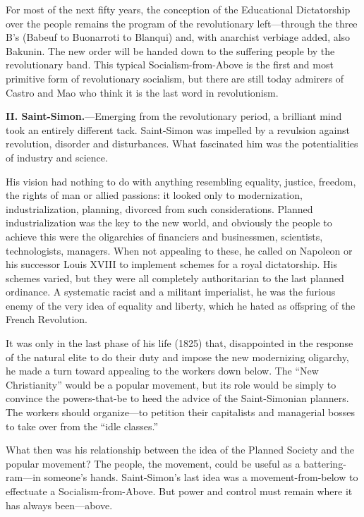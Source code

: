 For most of the next fifty years, the conception of the Educational Dictatorship over the people remains the program of the revolutionary left---through the three B's (Babeuf to Buonarroti to Blanqui) and, with anarchist verbiage added, also Bakunin. The new order will be handed down to the suffering people by the revolutionary band. This typical Socialism-from-Above is the first and most primitive form of revolutionary socialism, but there are still today admirers of Castro and Mao who think it is the last word in revolutionism.

\textbf{II. Saint-Simon.}---Emerging from the revolutionary period, a brilliant mind took an entirely different tack. Saint-Simon was impelled by a revulsion against revolution, disorder and disturbances. What fascinated him was the potentialities of industry and science.

His vision had nothing to do with anything resembling equality, justice, freedom, the rights of man or allied passions: it looked only to modernization, industrialization, planning, divorced from such considerations. Planned industrialization was the key to the new world, and obviously the people to achieve this were the oligarchies of financiers and businessmen, scientists, technologists, managers. When not appealing to these, he called on Napoleon or his successor Louis XVIII to implement schemes for a royal dictatorship. His schemes varied, but they were all completely authoritarian to the last planned ordinance. A systematic racist and a militant imperialist, he was the furious enemy of the very idea of equality and liberty, which he hated as offspring of the French Revolution.

It was only in the last phase of his life (1825) that, disappointed in the response of the natural elite to do their duty and impose the new modernizing oligarchy, he made a turn toward appealing to the workers down below. The ``New Christianity'' would be a popular movement, but its role would be simply to convince the powers-that-be to heed the advice of the Saint-Simonian planners. The workers should organize---to petition their capitalists and managerial bosses to take over from the ``idle classes.''

What then was his relationship between the idea of the Planned Society and the popular movement? The people, the movement, could be useful as a battering-ram---in someone's hands. Saint-Simon's last idea was a movement-from-below to effectuate a Socialism-from-Above. But power and control must remain where it has always been---above.

